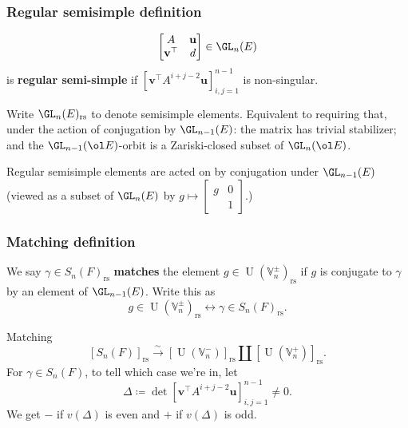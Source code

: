 \documentclass[11pt]{beamer}
\DeclareMathOperator{\U}{U}
\newcommand{\VV}{\mathbb{V}}
\newcommand{\rs}{_{\text{rs}}}
\newcommand{\uu}{\mathbf{u}}
\newcommand{\vv}{\mathbf{v}}
\begin{document}
\begin{frame}
  \frametitle{Regular semisimple definition}
  \[ \begin{bmatrix} A & \uu \\ \vv^\top & d \end{bmatrix} \in \GL_n(E) \]
  is \textbf{regular semi-simple} if
  $\left[ \vv^\top A^{i+j-2} \uu \right]_{i,j=1}^{n-1}$
  is non-singular.
  \begin{itemize}
    \ii Write $\GL_n(E)\rs$ to denote semisimple elements.
    \ii Equivalent to requiring that, under the action of conjugation by $\GL_{n-1}(E)$:
    the matrix has trivial stabilizer; and
    the $\GL_{n-1}(\ol E)$-orbit is a Zariski-closed subset of $\GL_n(\ol E)$.
  \end{itemize}
  Regular semisimple elements are acted on by conjugation under $\GL_{n-1}(E)$
  (viewed as a subset of $\GL_n(E)$ by $g \mapsto \begin{bmatrix} g & 0 \\ & 1 \end{bmatrix}$.)
\end{frame}

\begin{frame}
  \frametitle{Matching definition}
  We say $\gamma \in S_n(F)\rs$ \textbf{matches} the element $g \in \U(\VV_n^\pm)\rs$
  if $g$ is conjugate to $\gamma$ by an element of $\GL_{n-1}(E)$.
  Write this as
  \[ g \in \U(\VV_n^\pm)\rs \longleftrightarrow \gamma \in S_n(F)\rs. \]
  \begin{block}{Matching}
    \[ [S_n(F)]\rs \xrightarrow{\sim} [\U(\VV_n^-)]\rs \amalg [\U(\VV_n^+)]\rs. \]
    For $\gamma \in S_n(F)$, to tell which case we're in, let
    \[ \Delta \coloneqq \det \left[ \vv^\top A^{i+j-2} \uu \right]_{i,j=1}^{n-1} \neq 0. \]
    We get $-$ if $v(\Delta)$ is even
    and $+$ if $v(\Delta)$ is odd.
  \end{block}
\end{frame}
\end{document}

